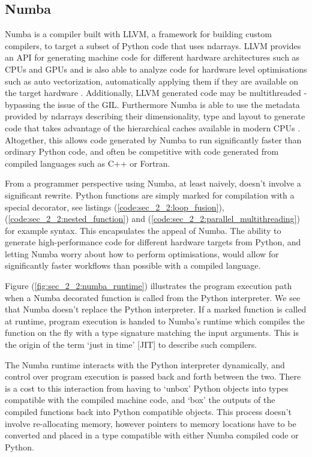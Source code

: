 \subsection*{Numba}

Numba is a compiler built with LLVM, a framework for building custom compilers, to target a subset of Python code that uses ndarrays. LLVM provides an API for generating machine code for different hardware architectures such as CPUs and GPUs and is also able to analyze code for hardware level optimisations such as auto vectorization, automatically applying them if they are available on the target hardware \cite{lattner2004llvm}. Additionally, LLVM generated code may be multithreaded - bypassing the issue of the GIL. Furthermore Numba is able to use the metadata provided by ndarrays describing their dimensionality, type and layout to generate code that takes advantage of the hierarchical caches available in modern CPUs \cite{lam2015numba}. Altogether, this allows code generated by Numba to run significantly faster than ordinary Python code, and often be competitive with code generated from compiled languages such as C++ or Fortran. 

From a programmer perspective using Numba, at least naively, doesn't involve a significant rewrite. Python functions are simply marked for compilation with a special decorator, see listings (\ref{code:sec_2_2:loop_fusion}), (\ref{code:sec_2_2:nested_function}) and (\ref{code:sec_2_2:parallel_multithreading}) for example syntax. This encapsulates the appeal of Numba. The ability to generate high-performance code for different hardware targets from Python, and letting Numba worry about how to perform optimisations, would allow for significantly faster workflows than possible with a compiled language.

Figure (\ref{fig:sec_2_2:numba_runtime}) illustrates the program execution path when a Numba decorated function is called from the Python interpreter. We see that Numba doesn't replace the Python interpreter. If a marked function is called at runtime, program execution is handed to Numba's runtime which compiles the function on the fly with a type signature matching the input arguments. This is the origin of the term `just in time' [JIT] to describe such compilers.

The Numba runtime interacts with the Python interpreter dynamically, and control over program execution is passed back and forth between the two. There is a cost to this interaction from having to `unbox' Python objects into types compatible with the compiled machine code, and `box' the outputs of the compiled functions back into Python compatible objects. This process doesn't involve re-allocating memory, however pointers to memory locations have to be converted and placed in a type compatible with either Numba compiled code or Python.

